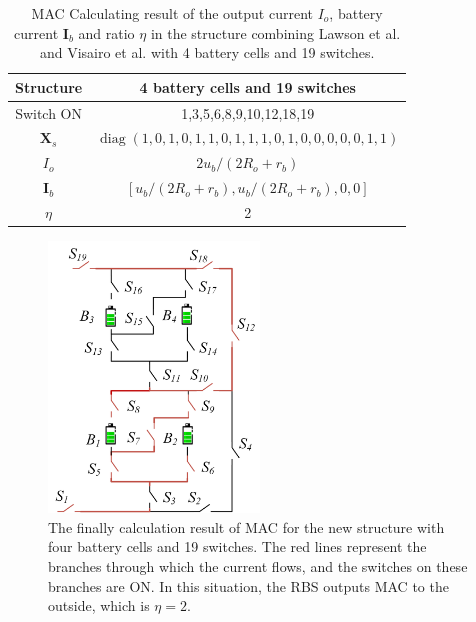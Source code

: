 \documentclass{article}
\DeclareMathOperator{\diag}{diag}
\begin{document}
\begin{table}[htbp]
  \centering
    \caption{MAC Calculating result of the output current $I_o$, battery current $\bm{I}_b$ and ratio $\eta$ in the structure combining Lawson et al.\cite{lawsonSoftwareConfigurableBattery2012} and Visairo et al.\cite{visairoReconfigurableBatteryPack2008} with 4 battery cells and 19 switches.}
    \begin{tabular}{cc}
    \toprule
        Structure & 4 battery cells and 19 switches  \\
    \midrule
    Switch ON & 1,3,5,6,8,9,10,12,18,19 \\
    $\bm{X}_s$ & $\diag(1,0,1,0,1,1,0,1,1,1,0,1,0,0,0,0,0,1,1)$ \\
    \midrule
        $I_o$ & $2u_b/(2R_o+r_b)$ \\
        $\bm{I}_b$ & $[u_b/(2R_o+r_b),u_b/(2R_o+r_b),0,0]$ \\
        $\eta$     & 2 \\
    \bottomrule
    \end{tabular}%
  \label{tab:find_mac}%
\end{table}%

\begin{figure}[htbp]
    \centering
    \includegraphics[width=0.5\textwidth]{../attachments/ef-mac.png}
    \caption{
        The finally calculation result of MAC for the new structure with four battery cells and 19 switches.
        The red lines represent the branches through which the current flows, and the switches on these branches are ON. 
        In this situation, the RBS outputs MAC to the outside, which is $\eta=2$.
    }\label{fig:ef-mac}
\end{figure}
\end{document}

